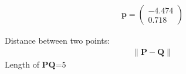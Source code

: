 \documentclass[journal,10pt,twocolumn]{article}
\providecommand{\norm}[1]{\left\lVert#1\right\rVert}
\let\vec\mathbf
\newcommand{\myvec}[1]{\ensuremath{\begin{pmatrix}#1\end{pmatrix}}}
\begin{document}
   \begin{align}
   \vec{p}=\myvec{-4.474\\0.718}
   \end{align}

























Distance between two points:
\begin{eqnarray}
\norm{\vec{P}-\vec{Q}}
\end{eqnarray}
 Length of $\vec{PQ}$=5
\end{document}
